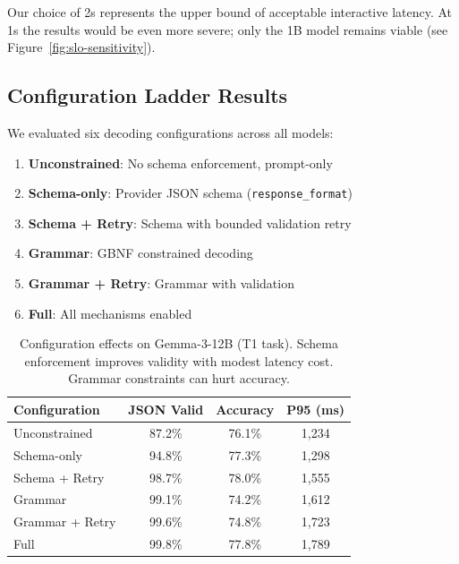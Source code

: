 \documentclass[11pt]{article}
\begin{document}
Our choice of 2s represents the upper bound of acceptable interactive latency.
At 1s the results would be even more severe; only the 1B model remains viable (see Figure~\ref{fig:slo-sensitivity}).

\subsection{Configuration Ladder Results}

We evaluated six decoding configurations across all models:
\begin{enumerate}[leftmargin=12pt]
    \item \textbf{Unconstrained}: No schema enforcement, prompt-only
    \item \textbf{Schema-only}: Provider JSON schema (\texttt{response\_format})
    \item \textbf{Schema + Retry}: Schema with bounded validation retry
    \item \textbf{Grammar}: GBNF constrained decoding
    \item \textbf{Grammar + Retry}: Grammar with validation
    \item \textbf{Full}: All mechanisms enabled
\end{enumerate}

\begin{table}[t]
\centering
\caption{Configuration effects on Gemma-3-12B (T1 task).  Schema enforcement improves validity with modest latency cost.  Grammar constraints can hurt accuracy.}
\label{tab:config-ladder}
\begin{tabular}{lccc}
\toprule
\textbf{Configuration} & \textbf{JSON Valid} & \textbf{Accuracy} & \textbf{P95 (ms)} \\
\midrule
Unconstrained & 87.2\% & 76.1\% & 1,234 \\
Schema-only & 94.8\% & 77.3\% & 1,298 \\
Schema + Retry & 98.7\% & 78.0\% & 1,555 \\
Grammar & 99.1\% & 74.2\% & 1,612 \\
Grammar + Retry & 99.6\% & 74.8\% & 1,723 \\
Full & 99.8\% & 77.8\% & 1,789 \\
\bottomrule
\end{tabular}
\end{table}
\end{document}
